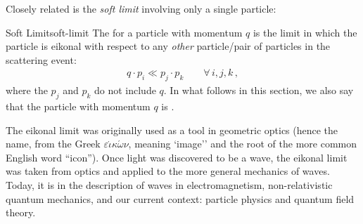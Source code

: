 


Closely related is the \textit{soft limit} involving only a single particle:
\begin{definitionbox}{Soft Limit}{soft-limit}
    The  for a particle with momentum \(q\) is the limit in which the particle is eikonal with respect to any \textit{other} particle/pair of particles in the scattering event:
    \begin{align}
        q \cdot p_i \ll p_j \cdot p_k \qquad \forall\,i,j,k
        \,,
    \end{align}
    where the \(p_j\) and \(p_k\) do not include \(q\).
    In what follows in this section, we also say that the particle with momentum \(q\) is .
\end{definitionbox}


The eikonal limit was originally used as a tool in geometric optics (hence the name, from the Greek \(\varepsilon \acute{\iota}\kappa \acute{\omega}\nu\), meaning `image'' and the root of the more common English word ``icon'').
%
Once light was discovered to be a wave, the eikonal limit was taken from optics and applied to the more general mechanics of waves.
%
Today, it is in the description of waves in electromagnetism, non-relativistic quantum mechanics, and our current context:
%
particle physics and quantum field theory.

